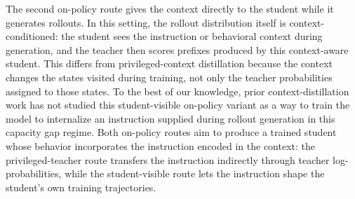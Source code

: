The second on-policy route gives the context directly to the student while it generates rollouts. In this setting, the rollout distribution itself is context-conditioned: the student sees the instruction or behavioral context during generation, and the teacher then scores prefixes produced by this context-aware student. This differs from privileged-context distillation because the context changes the states visited during training, not only the teacher probabilities assigned to those states. To the best of our knowledge, prior context-distillation work has not studied this student-visible on-policy variant as a way to train the model to internalize an instruction supplied during rollout generation in this capacity gap regime. Both on-policy routes aim to produce a trained student whose behavior incorporates the instruction encoded in the context: the privileged-teacher route transfers the instruction indirectly through teacher log-probabilities, while the student-visible route lets the instruction shape the student's own training trajectories.
